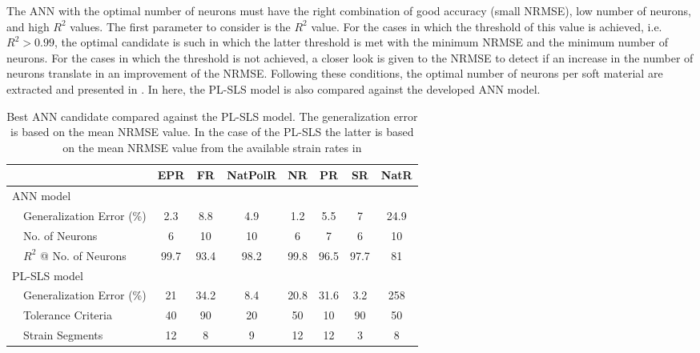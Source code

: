 The ANN with the optimal number of neurons must have the right combination of good accuracy (small NRMSE), low number of neurons, and high $R^2$ values. The first parameter to consider is the $R^2$ value. For the cases in which the threshold of this value is achieved, i.e. $R^2 > 0.99$, the optimal candidate is such in which the latter threshold is met with the minimum NRMSE and the minimum number of neurons. For the cases in which the threshold is not achieved, a closer look is given to the NRMSE to detect if an increase in the number of neurons translate in an improvement of the NRMSE. Following these conditions, the optimal number of neurons per soft material are extracted and presented in . In here, the PL-SLS model is also compared against the developed ANN model.

\begin{table}[htbp!]
    \centering
    \caption{Best ANN candidate compared against the PL-SLS model. The generalization error is based on the mean NRMSE value. In the case of the PL-SLS the latter is based on the mean NRMSE value from the available strain rates in }
    \begin{tabular}{p{1em} l ccccccc}
    \toprule
                    &                   & EPR   & FR    & NatPolR & NR  & PR    & SR    & NatR\\
    \hline
    \multicolumn{9}{l}{ANN model}\\
    &Generalization Error (\%)          & 2.3   & 8.8   & 4.9   & 1.2   &5.5    & 7     &   24.9\\
    &No. of Neurons                     & 6     & 10    & 10    & 6     &7      & 6     &   10\\
    &$R^2$ @ No. of Neurons             & 99.7  & 93.4  & 98.2  & 99.8  &96.5   & 97.7  &   81\\
    \midrule
    \multicolumn{9}{l}{PL-SLS model}\\
    &Generalization Error (\%)          & 21    & 34.2  & 8.4   & 20.8  & 31.6  & 3.2   & 258\\
    &Tolerance Criteria                 & 40    & 90    & 20    & 50    & 10    & 90    & 50\\
    &Strain Segments                    & 12    & 8     & 9     & 12    & 12    & 3     & 8\\
    \bottomrule
    \end{tabular}
    \label{tbl:ANNvsSLS}
\end{table}


